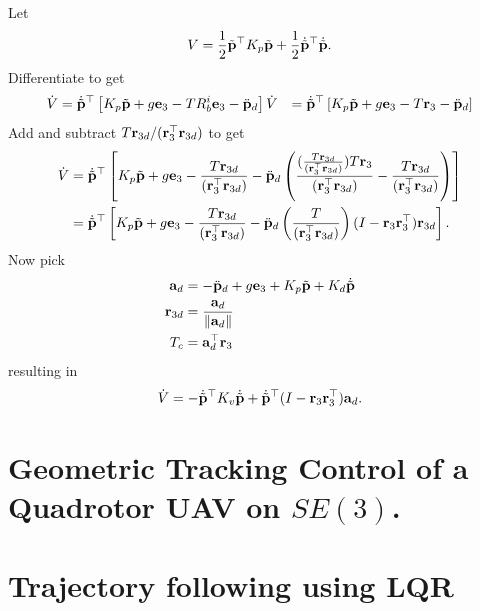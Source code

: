 Let 
\[
V=\frac{1}{2}\tilde{\mathbf{p}}^\top K_p \tilde{\mathbf{p}} + \frac{1}{2}\dot{\tilde{\mathbf{p}}}^\top \dot{\tilde{\mathbf{p}}}.
\]
Differentiate to get
\begin{align*}
\dot{V} &= \dot{\tilde{\mathbf{p}}}^\top \left[ K_p\tilde{\mathbf{p}} + g\mathbf{e}_3 - TR_b^i\mathbf{e}_3 -\ddot{\mathbf{p}}_d \right]
\dot{V} &= \dot{\tilde{\mathbf{p}}}^\top \left[ K_p\tilde{\mathbf{p}} + g\mathbf{e}_3 - T\mathbf{r}_3 -\ddot{\mathbf{p}}_d \right]
\end{align*}
Add and subtract $T\mathbf{r}_{3d}/(\mathbf{r}_3^\top \mathbf{r}_{3d})$ to get
\begin{align*}
\dot{V} &= \dot{\tilde{\mathbf{p}}}^\top \left[ K_p\tilde{\mathbf{p}} + g\mathbf{e}_3 - \frac{T\mathbf{r}_{3d}}{(\mathbf{r}_3^\top \mathbf{r}_{3d})}  -\ddot{\mathbf{p}}_d  \left(\frac{(\frac{T\mathbf{r}_{3d}}{(\mathbf{r}_3^\top \mathbf{r}_{3d})})T\mathbf{r}_{3}}{(\mathbf{r}_3^\top \mathbf{r}_{3d})}-\frac{T\mathbf{r}_{3d}}{(\mathbf{r}_3^\top \mathbf{r}_{3d})}\right)\right] \\
&= \dot{\tilde{\mathbf{p}}}^\top \left[ K_p\tilde{\mathbf{p}} + g\mathbf{e}_3 - \frac{T\mathbf{r}_{3d}}{(\mathbf{r}_3^\top \mathbf{r}_{3d})}  -\ddot{\mathbf{p}}_d  \left(\frac{T}{(\mathbf{r}_3^\top \mathbf{r}_{3d})}\right)(I-\mathbf{r}_3\mathbf{r}_3^\top)\mathbf{r}_{3d}\right].
\end{align*}
Now pick
\begin{align*}
\mathbf{a}_d &= -\ddot{\mathbf{p}}_d + g\mathbf{e}_3 + K_p\tilde{\mathbf{p}} + K_d\dot{\tilde{\mathbf{p}}} \\	
\mathbf{r}_{3d} &= \frac{\mathbf{a}_d}{\left\|\mathbf{a}_d\right\|} \\
T_c &= \mathbf{a}_d^\top \mathbf{r}_3
\end{align*}
resulting in 
\[
\dot{V} = -\dot{\tilde{\mathbf{p}}}^\top K_v \dot{\tilde{\mathbf{p}}} + \dot{\tilde{\mathbf{p}}}^\top (I-\mathbf{r}_3\mathbf{r}_3^\top )\mathbf{a}_d.
\]



\section{Geometric Tracking Control of a Quadrotor {UAV} on $SE(3)$.}



\section{Trajectory following using LQR}





